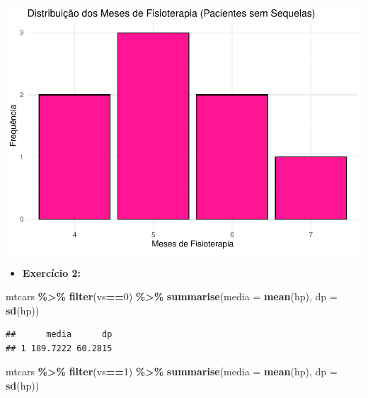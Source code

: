 \documentclass[
]{book}
\newenvironment{Shaded}{\begin{snugshade}}{\end{snugshade}}
\newcommand{\AttributeTok}[1]{\textcolor[rgb]{0.13,0.29,0.53}{#1}}
\newcommand{\DecValTok}[1]{\textcolor[rgb]{0.00,0.00,0.81}{#1}}
\newcommand{\FunctionTok}[1]{\textcolor[rgb]{0.13,0.29,0.53}{\textbf{#1}}}
\newcommand{\NormalTok}[1]{#1}
\newcommand{\SpecialCharTok}[1]{\textcolor[rgb]{0.81,0.36,0.00}{\textbf{#1}}}
\providecommand{\tightlist}{%
  \setlength{\itemsep}{0pt}\setlength{\parskip}{0pt}}
\begin{document}
\begin{center}\includegraphics{AED_files/figure-latex/cap6_ex1c-1} \end{center}

\begin{itemize}
\tightlist
\item
  \textbf{Exercício 2:}
\end{itemize}

\begin{Shaded}
\begin{Highlighting}[]
\NormalTok{mtcars }\SpecialCharTok{\%\textgreater{}\%} \FunctionTok{filter}\NormalTok{(vs}\SpecialCharTok{==}\DecValTok{0}\NormalTok{) }\SpecialCharTok{\%\textgreater{}\%} \FunctionTok{summarise}\NormalTok{(}\AttributeTok{media =} \FunctionTok{mean}\NormalTok{(hp), }\AttributeTok{dp =} \FunctionTok{sd}\NormalTok{(hp))}
\end{Highlighting}
\end{Shaded}

\begin{verbatim}
##      media      dp
## 1 189.7222 60.2815
\end{verbatim}

\begin{Shaded}
\begin{Highlighting}[]
\NormalTok{mtcars }\SpecialCharTok{\%\textgreater{}\%} \FunctionTok{filter}\NormalTok{(vs}\SpecialCharTok{==}\DecValTok{1}\NormalTok{) }\SpecialCharTok{\%\textgreater{}\%} \FunctionTok{summarise}\NormalTok{(}\AttributeTok{media =} \FunctionTok{mean}\NormalTok{(hp), }\AttributeTok{dp =} \FunctionTok{sd}\NormalTok{(hp))}
\end{Highlighting}
\end{Shaded}
\end{document}
